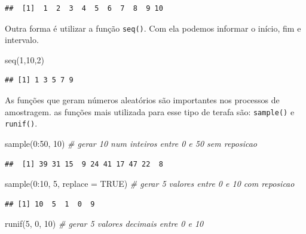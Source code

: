 \documentclass[
]{book}
\newenvironment{Shaded}{\begin{snugshade}}{\end{snugshade}}
\newcommand{\AttributeTok}[1]{\textcolor[rgb]{0.77,0.63,0.00}{#1}}
\newcommand{\CommentTok}[1]{\textcolor[rgb]{0.56,0.35,0.01}{\textit{#1}}}
\newcommand{\ConstantTok}[1]{\textcolor[rgb]{0.00,0.00,0.00}{#1}}
\newcommand{\DecValTok}[1]{\textcolor[rgb]{0.00,0.00,0.81}{#1}}
\newcommand{\FunctionTok}[1]{\textcolor[rgb]{0.00,0.00,0.00}{#1}}
\newcommand{\NormalTok}[1]{#1}
\newcommand{\SpecialCharTok}[1]{\textcolor[rgb]{0.00,0.00,0.00}{#1}}
\begin{document}
\begin{verbatim}
##  [1]  1  2  3  4  5  6  7  8  9 10
\end{verbatim}

Outra forma é utilizar a função \texttt{seq()}. Com ela podemos informar o início, fim e intervalo.

\begin{Shaded}
\begin{Highlighting}[]
\FunctionTok{seq}\NormalTok{(}\DecValTok{1}\NormalTok{,}\DecValTok{10}\NormalTok{,}\DecValTok{2}\NormalTok{)}
\end{Highlighting}
\end{Shaded}

\begin{verbatim}
## [1] 1 3 5 7 9
\end{verbatim}

As funções que geram números aleatórios são importantes nos processos de amostragem. as funções mais utilizada para esse tipo de terafa são: \texttt{sample()} e \texttt{runif()}.

\begin{Shaded}
\begin{Highlighting}[]
\FunctionTok{sample}\NormalTok{(}\DecValTok{0}\SpecialCharTok{:}\DecValTok{50}\NormalTok{, }\DecValTok{10}\NormalTok{) }\CommentTok{\# gerar 10 num inteiros entre 0 e 50 sem reposicao}
\end{Highlighting}
\end{Shaded}

\begin{verbatim}
##  [1] 39 31 15  9 24 41 17 47 22  8
\end{verbatim}

\begin{Shaded}
\begin{Highlighting}[]
\FunctionTok{sample}\NormalTok{(}\DecValTok{0}\SpecialCharTok{:}\DecValTok{10}\NormalTok{, }\DecValTok{5}\NormalTok{, }\AttributeTok{replace =} \ConstantTok{TRUE}\NormalTok{) }\CommentTok{\# gerar 5 valores entre 0 e 10 com reposicao}
\end{Highlighting}
\end{Shaded}

\begin{verbatim}
## [1] 10  5  1  0  9
\end{verbatim}

\begin{Shaded}
\begin{Highlighting}[]
\FunctionTok{runif}\NormalTok{(}\DecValTok{5}\NormalTok{, }\DecValTok{0}\NormalTok{, }\DecValTok{10}\NormalTok{) }\CommentTok{\# gerar 5 valores decimais entre 0 e 10}
\end{Highlighting}
\end{Shaded}
\end{document}
